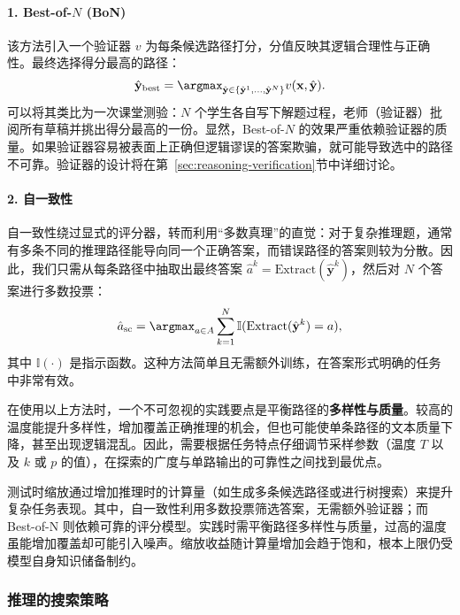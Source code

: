 \paragraph{1. Best-of-$N$ (BoN)}
该方法引入一个验证器 $v$ 为每条候选路径打分，分值反映其逻辑合理性与正确性。最终选择得分最高的路径：
\begin{eqnarray}
\hat{\mathbf{y}}_{\mathrm{best}} = \argmax_{\hat{\mathbf{y}} \in \{\hat{\mathbf{y}}^1, \dots, \hat{\mathbf{y}}^N\}} v(\mathbf{x}, \hat{\mathbf{y}}).
\end{eqnarray}
可以将其类比为一次课堂测验：$N$ 个学生各自写下解题过程，老师（验证器）批阅所有草稿并挑出得分最高的一份。显然，Best-of-$N$ 的效果严重依赖验证器的质量。如果验证器容易被表面上正确但逻辑谬误的答案欺骗，就可能导致选中的路径不可靠。验证器的设计将在第~\ref{sec:reasoning-verification}节中详细讨论。

\paragraph{2. 自一致性}
自一致性绕过显式的评分器，转而利用“多数真理”的直觉：对于复杂推理题，通常有多条不同的推理路径能导向同一个正确答案，而错误路径的答案则较为分散。因此，我们只需从每条路径中抽取出最终答案 $\hat{a}^k = \mathrm{Extract}(\hat{\mathbf{y}}^k)$，然后对 $N$ 个答案进行多数投票：
\begin{eqnarray}
\hat{a}_{\mathrm{sc}} = \argmax_{a \in A} \sum_{k=1}^N \mathbb{I}(\mathrm{Extract}(\hat{\mathbf{y}}^k) = a),
\end{eqnarray}
其中 $\mathbb{I}(\cdot)$ 是指示函数。这种方法简单且无需额外训练，在答案形式明确的任务中非常有效。

在使用以上方法时，一个不可忽视的实践要点是平衡路径的\textbf{多样性与质量}。较高的温度能提升多样性，增加覆盖正确推理的机会，但也可能使单条路径的文本质量下降，甚至出现逻辑混乱。因此，需要根据任务特点仔细调节采样参数（温度 $T$ 以及 $k$ 或 $p$ 的值），在探索的广度与单路输出的可靠性之间找到最优点。

\begin{importantnote}
测试时缩放通过增加推理时的计算量（如生成多条候选路径或进行树搜索）来提升复杂任务表现。其中，自一致性利用多数投票筛选答案，无需额外验证器；而 Best-of-N 则依赖可靠的评分模型。实践时需平衡路径多样性与质量，过高的温度虽能增加覆盖却可能引入噪声。缩放收益随计算量增加会趋于饱和，根本上限仍受模型自身知识储备制约。
\end{importantnote}

\subsubsection{推理的搜索策略}
\label{sec:search-strategies-for-reasoning}

